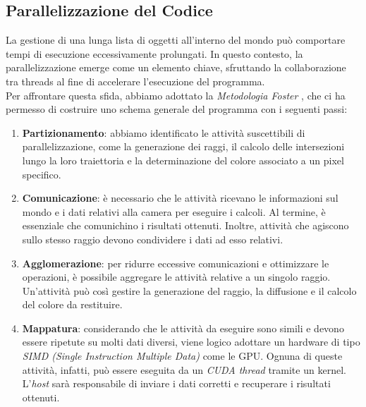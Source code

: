 \documentclass[main.tex]{subfiles}
\begin{document}
\subsection{Parallelizzazione del Codice}
La gestione di una lunga lista di oggetti all'interno del mondo può comportare tempi di esecuzione eccessivamente prolungati. In questo contesto, la parallelizzazione emerge come un elemento chiave, sfruttando la collaborazione tra threads al fine di accelerare l'esecuzione del programma. \\
Per affrontare questa sfida, abbiamo adottato la \textit{Metodologia Foster} \cite{Foster}, che ci ha permesso di costruire uno schema generale del programma con i seguenti passi:
\begin{enumerate}
    \item \textbf{Partizionamento}: abbiamo identificato le attività suscettibili di parallelizzazione, come la generazione dei raggi, il calcolo delle intersezioni lungo la loro traiettoria e la determinazione del colore associato a un pixel specifico.
    
    \item \textbf{Comunicazione}: è necessario che le attività ricevano le informazioni sul mondo e i dati relativi alla camera per eseguire i calcoli. Al termine, è essenziale che comunichino i risultati ottenuti. Inoltre, attività che agiscono sullo stesso raggio devono condividere i dati ad esso relativi.
    
    \item \textbf{Agglomerazione}: per ridurre eccessive comunicazioni e ottimizzare le operazioni, è possibile aggregare le attività relative a un singolo raggio. Un'attività può così gestire la generazione del raggio, la diffusione e il calcolo del colore da restituire. 
    
    \item \textbf{Mappatura}: considerando che le attività da eseguire sono simili e devono essere ripetute su molti dati diversi, viene logico adottare un hardware di tipo \textit{SIMD (Single Instruction Multiple Data)} \cite{flynn} come le GPU. Ognuna di queste attività, infatti, può essere eseguita da un \textit{CUDA thread} tramite un kernel. L'\textit{host} sarà responsabile di inviare i dati corretti e recuperare i risultati ottenuti.
    
\end{enumerate}
\end{document}
